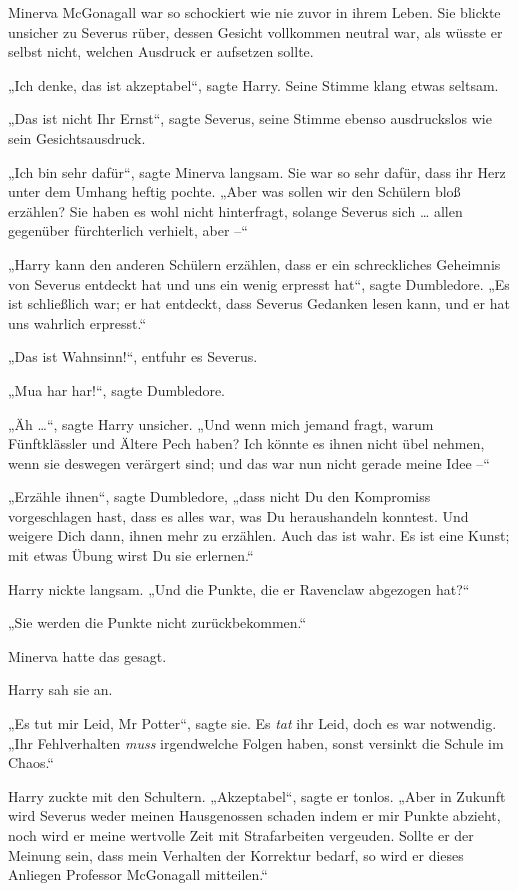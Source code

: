 {Minerva McGonagall war so schockiert wie nie zuvor in ihrem Leben. Sie blickte unsicher zu Severus rüber, dessen Gesicht vollkommen neutral war, als wüsste er selbst nicht, welchen Ausdruck er aufsetzen sollte.

„Ich denke, das ist akzeptabel“, sagte Harry. Seine Stimme klang etwas seltsam.

„Das ist nicht Ihr Ernst“, sagte Severus, seine Stimme ebenso ausdruckslos wie sein Gesichtsausdruck.

„Ich bin sehr dafür“, sagte Minerva langsam. Sie war so sehr dafür, dass ihr Herz unter dem Umhang heftig pochte. „Aber was sollen wir den Schülern bloß erzählen? Sie haben es wohl nicht hinterfragt, solange Severus sich … allen gegenüber fürchterlich verhielt, aber --“

„Harry kann den anderen Schülern erzählen, dass er ein schreckliches Geheimnis von Severus entdeckt hat und uns ein wenig erpresst hat“, sagte Dumbledore. „Es ist schließlich war; er hat entdeckt, dass Severus Gedanken lesen kann, und er hat uns wahrlich erpresst.“

„Das ist Wahnsinn!“, entfuhr es Severus.

„Mua har har!“, sagte Dumbledore.

„Äh …“, sagte Harry unsicher. „Und wenn mich jemand fragt, warum Fünftklässler und Ältere Pech haben? Ich könnte es ihnen nicht übel nehmen, wenn sie deswegen verärgert sind; und das war nun nicht gerade meine Idee --“

„Erzähle ihnen“, sagte Dumbledore, „dass nicht Du den Kompromiss vorgeschlagen hast, dass es alles war, was Du heraushandeln konntest. Und weigere Dich dann, ihnen mehr zu erzählen. Auch das ist wahr. Es ist eine Kunst; mit etwas Übung wirst Du sie erlernen.“

Harry nickte langsam. „Und die Punkte, die er Ravenclaw abgezogen hat?“

„Sie werden die Punkte nicht zurückbekommen.“

Minerva hatte das gesagt.

Harry sah sie an.

„Es tut mir Leid, Mr Potter“, sagte sie. Es \emph{tat} ihr Leid, doch es war notwendig. „Ihr Fehlverhalten \emph{muss} irgendwelche Folgen haben, sonst versinkt die Schule im Chaos.“

Harry zuckte mit den Schultern. „Akzeptabel“, sagte er tonlos. „Aber in Zukunft wird Severus weder meinen Hausgenossen schaden indem er mir Punkte abzieht, noch wird er meine wertvolle Zeit mit Strafarbeiten vergeuden. Sollte er der Meinung sein, dass mein Verhalten der Korrektur bedarf, so wird er dieses Anliegen Professor McGonagall mitteilen.“

}
